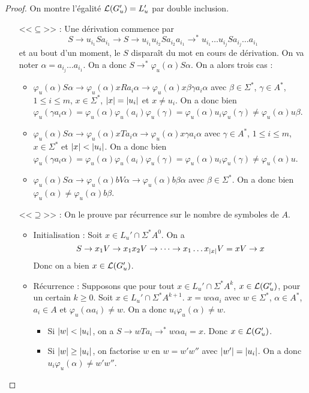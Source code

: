 \documentclass[10pt,a4paper,notitlepage]{article}
\theoremstyle{plain}
\theoremstyle{definition}
\theoremstyle{definition}
\theoremstyle{remark}
\theoremstyle{remark}
\theoremstyle{plain}
\theoremstyle{plain}
\theoremstyle{plain}
\theoremstyle{remark}
\begin{document}
\begin{proof}
	On montre l'égalité $\mathcal{L}(G_u')= L_u'$ par double inclusion.
	\begin{itemize}
		\item[<<$\subseteq$>>] : Une dérivation commence par$$\displaystyle S\to u_{i_1}Sa_{i_1}\to S\to u_{i_1}u_{i_2}Sa_{i_2}a_{i_1}\to^* u_{i_1}\dots u_{i_j}Sa_{i_j}\dots a_{i_1}$$ et au bout d'un moment, le $S$ disparaît du mot en cours de dérivation. On va noter $\alpha=a_{i_j}\dots a_{i_1}$. On a donc $S\to^*\varphi_u(\alpha)S\alpha$. On a alors trois cas :
		\begin{itemize}
			\item $\varphi_u(\alpha)S\alpha\to \varphi_u(\alpha)xRa_i\alpha\to \varphi_u(\alpha)x\beta\gamma a_i\alpha$ avec $\beta\in \Sigma^*$, $\gamma\in A^*$, $1\le i \le m$, $x\in\Sigma^*$, $\left|x\right|=\left|u_i\right|$ et $x\not=u_i$. On a donc bien $\varphi_u(\gamma a_i\alpha)=\varphi_u(\alpha)\varphi_u(a_i)\varphi_u(\gamma)=\varphi_u(\alpha)u_i\varphi_u(\gamma)\not=\varphi_u(\alpha)u\beta$.
			\item $\varphi_u(\alpha)S\alpha\to \varphi_u(\alpha)xTa_i\alpha\to \varphi_u(\alpha)x\gamma a_i\alpha$ avec $\gamma\in A^*$, $1\le i \le m$, $x\in\Sigma^*$ et $\left|x\right|<\left|u_i\right|$. On a donc bien $\varphi_u(\gamma a_i\alpha)=\varphi_u(\alpha)\varphi_u(a_i)\varphi_u(\gamma)=\varphi_u(\alpha)u_i\varphi_u(\gamma)\not=\varphi_u(\alpha)u$.
			\item $\varphi_u(\alpha)S\alpha\to \varphi_u(\alpha)bV\alpha\to \varphi_u(\alpha)b\beta \alpha$ avec $\beta\in \Sigma^*$. On a donc bien $\varphi_u(\alpha)\not=\varphi_u(\alpha)b\beta$.
		\end{itemize}
		\item[<<$\supseteq$>>] : On le prouve par récurrence sur le nombre de symboles de $A$.
		\begin{itemize}
			\item Initialisation : Soit $x\in L_u'\cap\Sigma^*A^0$. On a
			$$S\to x_1V \to x_1x_2V\to \dots \to x_1\dots x_{\left|x\right|}V=xV\to x$$
			Donc on a bien $x\in \mathcal{L}(G_u')$.
			\item Récurrence : Supposons que pour tout $x\in L_u'\cap\Sigma^*A^k$, $x\in \mathcal{L}(G_u')$, pour un certain $k\ge 0$. Soit $x \in L_u'\cap\Sigma^*A^{k+1}$. $x=w\alpha a_i$ avec $w\in\Sigma^*$, $\alpha\in A^*$, $a_i\in A$ et $\varphi_u(\alpha a_i)\not= w$. On a donc $u_i\varphi_u(\alpha)\not= w$.
			\begin{itemize}
				\item Si $\left|w\right|<\left|u_i\right|$, on a $S\to wTa_i\to^* w\alpha a_i=x$. Donc $x\in \mathcal{L}(G_u')$.
				\item Si $\left|w\right|\ge \left|u_i\right|$, on factorise $w$ en $w=w'w''$ avec $\left|w'\right|=\left|u_i\right|$. On a donc $u_i\varphi_u(\alpha)\not= w'w''$.

\end{itemize}
\end{itemize}
\end{itemize}
\end{proof}
\end{document}
